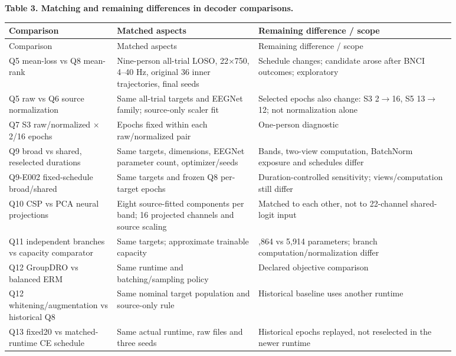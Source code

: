 \documentclass[11pt]{article}
\begin{document}
\par\medskip\noindent\textbf{Table 3. Matching and remaining differences in decoder comparisons.}
\begingroup\small\setlength{\tabcolsep}{4pt}
\begin{longtable}{@{}>{\raggedright\arraybackslash}p{0.197015\linewidth}>{\raggedright\arraybackslash}p{0.288955\linewidth}>{\raggedright\arraybackslash}p{0.394030\linewidth}@{}}
\toprule
Comparison & Matched aspects & Remaining difference / scope \\
\midrule\endfirsthead
\toprule
Comparison & Matched aspects & Remaining difference / scope \\
\midrule\endhead
\bottomrule\endfoot
\bottomrule\endlastfoot
Q5 mean-loss vs Q8 mean-rank & Nine-person all-trial LOSO, 22$\times$750, 4--40 Hz, original 36 inner trajectories, final seeds & Schedule changes; candidate arose after BNCI outcomes; exploratory \\
Q5 raw vs Q6 source normalization & Same all-trial targets and EEGNet family; source-only scaler fit & Selected epochs also change: S3 2$\to$16, S5 13$\to$12; not normalization alone \\
Q7 S3 raw/normalized $\times$2/16 epochs & Epochs fixed within each raw/normalized pair & One-person diagnostic \\
Q9 broad vs shared, reselected durations & Same targets, dimensions, EEGNet parameter count, optimizer/seeds & Bands, two-view computation, BatchNorm exposure and schedules differ \\
Q9-E002 fixed-schedule broad/shared & Same targets and frozen Q8 per-target epochs & Duration-controlled sensitivity; views/computation still differ \\
Q10 CSP vs PCA neural projections & Eight source-fitted components per band; 16 projected channels and source scaling & Matched to each other, not to 22-channel shared-logit input \\
Q11 independent branches vs capacity comparator & Same targets; approximate trainable capacity & 5,864 vs 5,914 parameters; branch computation/normalization differ \\
Q12 GroupDRO vs balanced ERM & Same runtime and batching/sampling policy & Declared objective comparison \\
Q12 whitening/augmentation vs historical Q8 & Same nominal target population and source-only rule & Historical baseline uses another runtime \\
Q13 fixed20 vs matched-runtime CE schedule & Same actual runtime, raw files and three seeds & Historical epochs replayed, not reselected in the newer runtime \\

\end{longtable}
\end{document}
